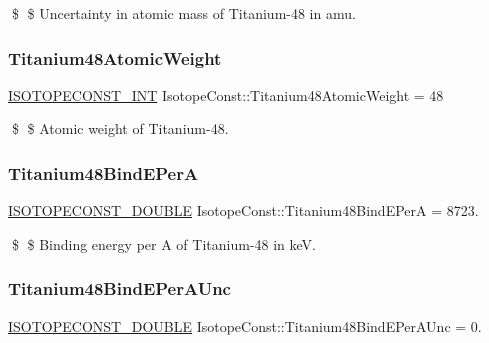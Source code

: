 \$ \$ Uncertainty in atomic mass of Titanium-\/48 in amu. \mbox{\label{group___isotope_const-_titanium-_ti48_ga8ca42f5f504be739bc4ae11f813e9a3f}} 
\subsubsection{\texorpdfstring{Titanium48\+Atomic\+Weight}{Titanium48AtomicWeight}}
{\footnotesize\ttfamily \mbox{\hyperlink{group___isotope_const-_macros_ga5f18360b3e99483a35c32d789e62621c}{I\+S\+O\+T\+O\+P\+E\+C\+O\+N\+S\+T\+\_\+\+I\+NT}} Isotope\+Const\+::\+Titanium48\+Atomic\+Weight = 48}

\$ \$ Atomic weight of Titanium-\/48. \mbox{\label{group___isotope_const-_titanium-_ti48_ga757c3693f2e22f35a5be20f912bc6d8d}} 
\subsubsection{\texorpdfstring{Titanium48\+Bind\+E\+PerA}{Titanium48BindEPerA}}
{\footnotesize\ttfamily \mbox{\hyperlink{group___isotope_const-_macros_ga8f45a7272ce02c0b4c65c44636ed719a}{I\+S\+O\+T\+O\+P\+E\+C\+O\+N\+S\+T\+\_\+\+D\+O\+U\+B\+LE}} Isotope\+Const\+::\+Titanium48\+Bind\+E\+PerA = 8723.}

\$ \$ Binding energy per A of Titanium-\/48 in keV. \mbox{\label{group___isotope_const-_titanium-_ti48_ga26c0979549b77fcb4e9170855da27204}} 
\subsubsection{\texorpdfstring{Titanium48\+Bind\+E\+Per\+A\+Unc}{Titanium48BindEPerAUnc}}
{\footnotesize\ttfamily \mbox{\hyperlink{group___isotope_const-_macros_ga8f45a7272ce02c0b4c65c44636ed719a}{I\+S\+O\+T\+O\+P\+E\+C\+O\+N\+S\+T\+\_\+\+D\+O\+U\+B\+LE}} Isotope\+Const\+::\+Titanium48\+Bind\+E\+Per\+A\+Unc = 0.}

